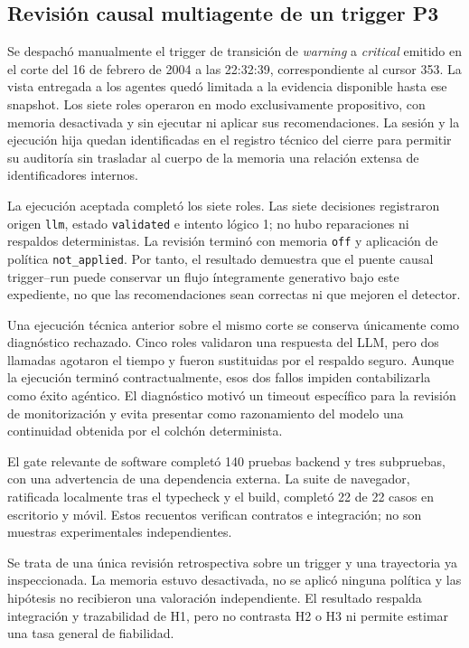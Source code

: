 \subsection{Revisión causal multiagente de un trigger P3}

Se despachó manualmente el trigger de transición de \textit{warning} a
\textit{critical} emitido en el corte del 16 de febrero de 2004 a las 22:32:39,
correspondiente al cursor 353. La vista entregada a los agentes quedó limitada
a la evidencia disponible hasta ese snapshot. Los siete roles operaron en modo
exclusivamente propositivo, con memoria desactivada y sin ejecutar ni aplicar
sus recomendaciones. La sesión y la ejecución hija quedan identificadas en el
registro técnico del cierre para permitir su auditoría sin trasladar al cuerpo
de la memoria una relación extensa de identificadores internos.

La ejecución aceptada completó los siete roles. Las siete decisiones
registraron origen \texttt{llm}, estado \texttt{validated} e intento lógico 1;
no hubo reparaciones ni respaldos deterministas. La revisión terminó con
memoria \texttt{off} y aplicación de política \texttt{not\_applied}. Por
tanto, el resultado demuestra que el puente causal trigger--run puede conservar
un flujo íntegramente generativo bajo este expediente, no que las
recomendaciones sean correctas ni que mejoren el detector.

Una ejecución técnica anterior sobre el mismo corte se conserva únicamente
como diagnóstico rechazado. Cinco roles validaron una respuesta del LLM, pero
dos llamadas agotaron el tiempo y fueron sustituidas por el respaldo seguro.
Aunque la ejecución terminó contractualmente, esos dos fallos impiden
contabilizarla como éxito agéntico. El diagnóstico motivó un timeout específico
para la revisión de monitorización y evita presentar como razonamiento del
modelo una continuidad obtenida por el colchón determinista.

El gate relevante de software completó 140 pruebas backend y tres subpruebas,
con una advertencia de una dependencia externa. La suite de navegador,
ratificada localmente tras el typecheck y el build, completó 22 de 22 casos en
escritorio y móvil. Estos recuentos verifican contratos e integración; no son
muestras experimentales independientes.

Se trata de una única revisión retrospectiva sobre un trigger y una trayectoria
ya inspeccionada. La memoria estuvo desactivada, no se aplicó ninguna política y
las hipótesis no recibieron una valoración independiente. El resultado respalda
integración y trazabilidad de H1, pero no contrasta H2 o H3 ni permite estimar
una tasa general de fiabilidad.

